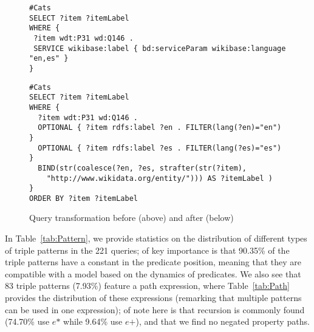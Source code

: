 \documentclass[runningheads]{llncs}
\begin{document}
\begin{figure}[!t]
\centering
{
	\begin{minipage}{0.8\textwidth}
	\begin{lstlisting}[style=sparqld]
#Cats
SELECT ?item ?itemLabel
WHERE {
 ?item wdt:P31 wd:Q146 .
 SERVICE wikibase:label { bd:serviceParam wikibase:language "en,es" }
}
	\end{lstlisting}
	\end{minipage}	
}

{
\begin{minipage}{0.8\textwidth}
	\begin{lstlisting}[style=sparqld]
#Cats
SELECT ?item ?itemLabel
WHERE {
  ?item wdt:P31 wd:Q146 .
  OPTIONAL { ?item rdfs:label ?en . FILTER(lang(?en)="en") }
  OPTIONAL { ?item rdfs:label ?es . FILTER(lang(?es)="es") }
  BIND(str(coalesce(?en, ?es, strafter(str(?item),
    "http://www.wikidata.org/entity/"))) AS ?itemLabel )
}
ORDER BY ?item ?itemLabel
	\end{lstlisting}
\end{minipage}	
}
\caption{Query transformation before (above) and after (below) \label{fig:transform}}
\end{figure}

In Table~\ref{tab:Pattern}, we provide statistics on the distribution of different types of triple patterns in the 221 queries; of key importance is that 90.35\% of the triple patterns have a constant in the predicate position, meaning that they are compatible with a model based on the dynamics of predicates. We also see that 83 triple patterns (7.93\%) feature a path expression, where Table~\ref{tab:Path} provides the distribution of these expressions (remarking that multiple patterns can be used in one expression); of note here is that recursion is commonly found (74.70\% use $e\texttt{*}$ while 9.64\% use $e\texttt{+}$), and that we find no negated property paths.
\end{document}
